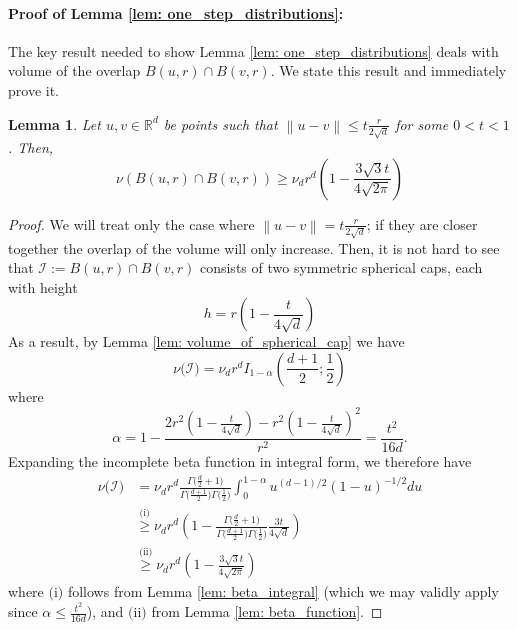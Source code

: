 \documentclass[11pt,twoside]{article}
\newtheorem{lemma}{Lemma}
\theoremstyle{definition}
\newcommand{\Reals}{\mathbb{R}}
\newcommand{\Rd}{\Reals^d}
\newcommand{\norm}[1]{\left\lVert#1\right\rVert}
\newcommand{\1}{\mathbbm{1}}
\begin{document}
\paragraph{Proof of Lemma \ref{lem: one_step_distributions}:}

The key result needed to show Lemma \ref{lem: one_step_distributions} deals with volume of the overlap $B(u,r) \cap B(v,r)$. We state this result and immediately prove it.
\begin{lemma}
	\label{lem: overlap_balls_1}
	Let $u,v \in \Rd$ be points such that $\norm{u - v} \leq t\frac{r}{2\sqrt{d}}$ for some $0 < t < 1$. Then,
	\begin{equation*}
	\nu(B(u,r) \cap B(v,r)) \geq \nu_d r^d \left(1 - \frac{3 \sqrt{3} t}{4\sqrt{2\pi}} \right)
	\end{equation*}
\end{lemma}
\begin{proof}
	We will treat only the case where $\norm{u - v} = t\frac{r}{2\sqrt{d}}$; if they are closer together the overlap of the volume will only increase. Then, it is not hard to see that $\mathcal{I} := B(u,r) \cap B(v,r)$ consists of two symmetric spherical caps, each with height
	\begin{equation*}
	h = r\left(1 - \frac{t}{4\sqrt{d}}\right)
	\end{equation*} 
	As a result, by Lemma \ref{lem: volume_of_spherical_cap} we have
	\begin{equation*}
	\nu\bigl(\mathcal{I}\bigr) = \nu_d r^d I_{1 - \alpha}(\frac{d + 1}{2}; \frac{1}{2})
	\end{equation*}
	where
	\begin{equation*}
	\alpha = 1 - \frac{2r^2(1 - \frac{t}{4 \sqrt{d}}) - r^2(1 - \frac{t}{4 \sqrt{d}})^2}{r^2} = \frac{t^2}{16d}.
	\end{equation*}
	Expanding the incomplete beta function in integral form, we therefore have
	\begin{align*}
	\nu\bigl(\mathcal{I}\bigr) & = \nu_d r^d \frac{\Gamma\bigl(\frac{d}{2}+ 1\bigr)}{\Gamma\bigl(\frac{d + 1}{2}\bigr) \Gamma\bigl(\frac{1}{2}\bigr)} \int_{0}^{1 - \alpha}u^{(d-1)/2}(1 - u)^{-1/2}du \\
	& \overset{\text{(i)}}{\geq} \nu_d r^d \left(1 - \frac{\Gamma\bigl(\frac{d}{2}+ 1\bigr)}{\Gamma\bigl(\frac{d + 1}{2}\bigr) \Gamma\bigl(\frac{1}{2}\bigr)} \frac{3 t}{4\sqrt{d}} \right) \\
	& \overset{\text{(ii)}}{\geq} \nu_d r^d \left(1 -  \frac{3 \sqrt{3} t}{4\sqrt{2\pi}} \right)
	\end{align*}
	where $\text{(i)}$ follows from Lemma \ref{lem: beta_integral} (which we may validly apply since $\alpha \leq \frac{t^2}{16d}$), and $\text{(ii)}$ from Lemma \ref{lem: beta_function}.
\end{proof}
\end{document}
